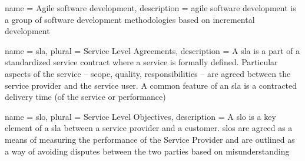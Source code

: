 {
	name = {Agile software development},
	description = {agile software development is a group of software development methodologies based on
		incremental development}
}

{
	name = {\acf{sla}},
	plural = {Service Level Agreements},
	description = {A \acf{sla} is a part of a standardized service contract where a service is formally defined.
		Particular aspects of the service – scope, quality, responsibilities – are agreed between the service provider
		and the service user. A common feature of an \ac{sla} is a contracted delivery time (of the service or performance)}
}

{
	name = {\acf{slo}},
	plural = {Service Level Objectives},
	description = {A \acf{slo} is a key element of a \ac{sla} between a service provider and a customer. \ac{slo}s
		are agreed as a means of measuring the performance of the Service Provider and are outlined as a way of avoiding
		disputes between the two parties based on misunderstanding}}